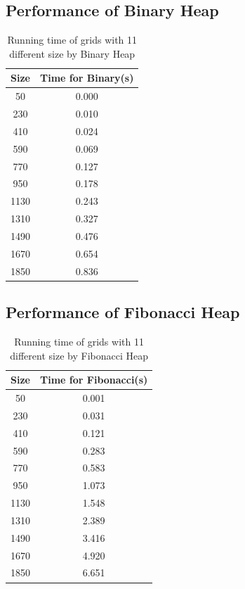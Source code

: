 \documentclass[12pt,a4paper]{article}
\theoremstyle{definition}
\begin{document}
\subsection{Performance of Binary Heap}
\begin{table}[h]
    \centering
    \begin{tabular}{|c|c|}
    \hline
    Size & Time for Binary(s) \\ \hline
    50   & 0.000  \\ \hline
    230  & 0.010  \\ \hline
    410  & 0.024  \\ \hline
    590  & 0.069  \\ \hline
    770  & 0.127  \\ \hline
    950  & 0.178  \\ \hline
    1130 & 0.243  \\ \hline
    1310 & 0.327  \\ \hline
    1490 & 0.476  \\ \hline
    1670 & 0.654  \\ \hline
    1850 & 0.836  \\ \hline
    \end{tabular}
    \caption{Running time of grids with 11 different size by Binary Heap}
    \label{binary}
\end{table}
\subsection{Performance of Fibonacci Heap}
\begin{table}[h]
    \centering
    \begin{tabular}{|c|c|}
    \hline
    Size & Time for Fibonacci(s) \\ \hline
    50   & 0.001     \\ \hline
    230  & 0.031     \\ \hline
    410  & 0.121     \\ \hline
    590  & 0.283     \\ \hline
    770  & 0.583     \\ \hline
    950  & 1.073     \\ \hline
    1130 & 1.548     \\ \hline
    1310 & 2.389     \\ \hline
    1490 & 3.416     \\ \hline
    1670 & 4.920     \\ \hline
    1850 & 6.651     \\ \hline
    \end{tabular}
    \caption{Running time of grids with 11 different size by Fibonacci Heap}
    \label{fib}
\end{table}
\newpage
\end{document}

